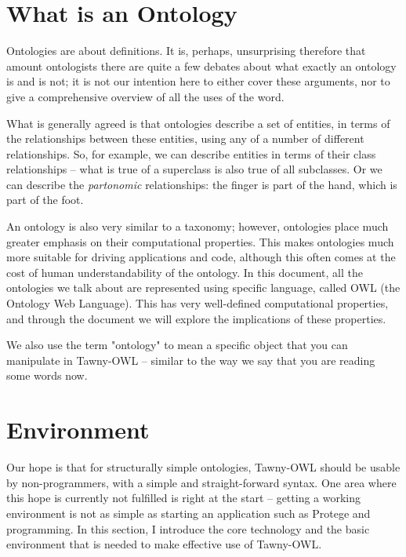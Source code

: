 \documentclass[11pt]{article}
\begin{document}
\section{What is an Ontology}
\label{sec-2}
\label{what_is_an_ontology}

Ontologies are about definitions. It is, perhaps, unsurprising therefore
that amount ontologists there are quite a few debates about what exactly
an ontology is and is not; it is not our intention here to either cover
these arguments, nor to give a comprehensive overview of all the uses of
the word.

What is generally agreed is that ontologies describe a set of entities,
in terms of the relationships between these entities, using any of a
number of different relationships. So, for example, we can describe
entities in terms of their class relationships -- what is true of a
superclass is also true of all subclasses. Or we can describe the
\emph{partonomic} relationships: the finger is part of the hand, which is
part of the foot.

An ontology is also very similar to a taxonomy; however, ontologies
place much greater emphasis on their computational properties. This
makes ontologies much more suitable for driving applications and code,
although this often comes at the cost of human understandability of the
ontology. In this document, all the ontologies we talk about are
represented using specific language, called OWL (the Ontology Web
Language). This has very well-defined computational properties, and
through the document we will explore the implications of these
properties.

We also use the term "ontology" to mean a specific object that you can
manipulate in Tawny-OWL -- similar to the way we say that you are
reading some words now.


\section{Environment}
\label{sec-3}

Our hope is that for structurally simple ontologies, Tawny-OWL should be
usable by non-programmers, with a simple and straight-forward syntax.
One area where this hope is currently not fulfilled is right at the
start -- getting a working environment is not as simple as starting an
application such as Protege and programming. In this section, I
introduce the core technology and the basic environment that is needed
to make effective use of Tawny-OWL.
\end{document}
